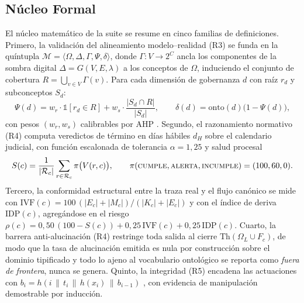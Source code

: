 \documentclass[computers,article,submit,pdftex,moreauthors]{Definitions/mdpi}
\begin{document}
\subsection{Núcleo Formal}
El núcleo matemático de la suite se resume en cinco familias de definiciones. Primero, la validación del alineamiento modelo--realidad (R3) se funda en la quíntupla $\mathcal{M} = \langle \Omega, \Delta, \Gamma, \Psi, \delta \rangle$, donde $\Gamma: V \rightarrow 2^{C}$ ancla los componentes de la sombra digital $\Delta = G(V,E,\lambda)$ a los conceptos de $\Omega$, induciendo el conjunto de cobertura $R = \bigcup_{v \in V} \Gamma(v)$. Para cada dimensión de gobernanza $d$ con raíz $r_d$ y subconceptos $S_d$:
\begin{equation}
\Psi(d) = w_r \cdot \mathbb{1}[r_d \in R] + w_s \cdot \frac{|S_d \cap R|}{|S_d|},
\qquad
\delta(d) = \mathrm{onto}(d)\bigl(1 - \Psi(d)\bigr),
\label{eq:psi}
\end{equation}
con pesos $(w_r, w_s)$ calibrables por AHP \cite{Saaty1990}. Segundo, el razonamiento normativo (R4) computa veredictos de término en días hábiles $d_H$ sobre el calendario judicial, con función escalonada de tolerancia $\alpha = 1{,}25$ y salud procesal
\begin{equation}
S(c) = \frac{1}{|\mathcal{R}_c|} \sum_{r \in \mathcal{R}_c} \pi\bigl(V(r,c)\bigr),
\qquad
\pi(\textsc{cumple}, \textsc{alerta}, \textsc{incumple}) = (100, 60, 0).
\label{eq:salud}
\end{equation}
Tercero, la conformidad estructural entre la traza real y el flujo canónico \cite{Rozinat2008} se mide con $\mathrm{IVF}(c) = 100\,(|E_c|+|M_c|)/(|K_c|+|E_c|)$ y con el índice de deriva $\mathrm{IDP}(c)$, agregándose en el riesgo $\rho(c) = 0{,}50\,(100-S(c)) + 0{,}25\,\mathrm{IVF}(c) + 0{,}25\,\mathrm{IDP}(c)$. Cuarto, la barrera anti-alucinación (R4) restringe toda salida al cierre $\mathrm{Th}(\Omega_L \cup F_c)$, de modo que la tasa de alucinación emitida es nula por construcción sobre el dominio tipificado y todo lo ajeno al vocabulario ontológico se reporta como \emph{fuera de frontera}, nunca se genera. Quinto, la integridad (R5) encadena las actuaciones con $b_i = h(i \,\|\, t_i \,\|\, h(x_i) \,\|\, b_{i-1})$ \cite{Haber1991}, con evidencia de manipulación demostrable por inducción.
\end{document}
